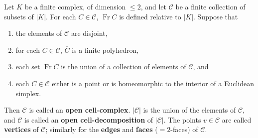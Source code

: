 Let $K$ be a finite complex, of dimension $\leqslant 2$, and let $\mathcal{C}$ be a finite collection of subsets of $|K|$. For each $C \in \mathcal{C}$, $\operatorname{Fr} C$ is defined relative to $|K|$. Suppose that
\begin{enumerate}
  \item[(1)] the elements of $\mathcal{C}$ are disjoint,
  \item[(2)] for each $C \in \mathcal{C}$, $\overline{C}$ is a finite polyhedron,
  \item[(3)] each set $\operatorname{Fr} C$ is the union of a collection of elements of $\mathcal{C}$, and
  \item[(4)] each $C \in \mathcal{C}$ either is a point or is homeomorphic to the interior of a Euclidean simplex.
\end{enumerate}
Then $\mathcal{C}$ is called an \textbf{open cell-complex}. $|\mathcal{C}|$ is the union of the elements of $\mathcal{C}$, and $\mathcal{C}$ is called an \textbf{open cell-decomposition} of $|\mathcal{C}|$. The points $v \in \mathcal{C}$ are called \textbf{vertices} of $\mathcal{C}$; similarly for the \textbf{edges} and \textbf{faces} ($=2$-faces) of $\mathcal{C}$.
